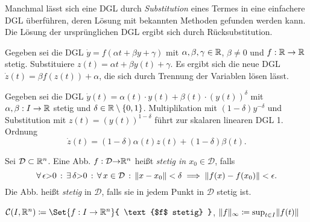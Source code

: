 \documentclass{cheat-sheet}
\begin{document}

\begin{technik}[Transformation]
  Manchmal lässt sich eine DGL durch \emph{Substitution} eines Termes in eine einfachere DGL überführen, deren Lösung mit bekannten Methoden gefunden werden kann. Die Lösung der ursprünglichen DGL ergibt sich durch Rücksubstitution.
\end{technik}

\begin{bsp}
  Gegeben sei die DGL $\dot{y} = f(\alpha t + \beta y + \gamma)$ mit $\alpha, \beta, \gamma \in \mathbb{R}$, $\beta \not= 0$ und $f : \mathbb{R} \to \mathbb{R}$ stetig. Substituiere $z(t) = \alpha t + \beta y(t) + \gamma$. Es ergibt sich die neue DGL $\dot{z}(t) = \beta f(z(t)) + \alpha$, die sich durch Trennung der Variablen lösen lässt.
\end{bsp}

\begin{bsp}
  Gegeben sei die DGL $\dot{y}(t) = \alpha(t) \cdot y(t) + \beta(t) \cdot (y(t))^{\delta}$ mit $\alpha, \beta : I \to \mathbb{R}$ stetig und $\delta \in \mathbb{R} \setminus \{0,1\}$. Multiplikation mit $(1-\delta) y^{-\delta}$ und Substitution mit $z(t) = (y(t))^{1-\delta}$ führt zur skalaren linearen DGL 1. Ordnung
  \[ \dot{z}(t) = (1-\delta) \alpha(t) z(t) + (1-\delta) \beta(t). \]
\end{bsp}






\begin{defn}
  Sei $\mathcal{D} \subset \mathbb{R}^n$. Eine Abb. $f : \mathcal{D} {\to} \mathbb{R}^n$ heißt \emph{stetig in $x_0 \in \mathcal{D}$}, falls
  \[ \forall \, {\epsilon {>} 0} \,:\, \exists \, {\delta {>} 0} \,:\, \forall \, {x \in \mathcal{D}} \,:\, \lVert x - x_0\rVert < \delta \implies \lVert f(x) - f(x_0)\rVert < \epsilon. \]
  Die Abb. heißt \emph{stetig} in $\mathcal{D}$, falls sie in jedem Punkt in $\mathcal{D}$ stetig ist.
\end{defn}

\begin{nota}
  $\mathcal{C}(I, \R^n) \coloneqq \Set{ f : I \to \R^n }{ \text{$f$ stetig} }$, $\lVert f\rVert_\infty \coloneqq \sup_{t \in I} \lVert f(t)\rVert$
\end{nota}
\end{document}
